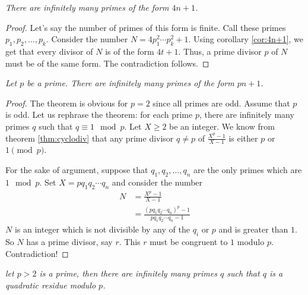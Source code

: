 \documentclass{subfiles}
\begin{document}
		\begin{theorem}\slshape
			There are infinitely many primes of the form $4n+1$.
		\end{theorem}

		\begin{proof}
			Let's say the number of primes of this form is finite. Call these primes $p_1,p_2,\ldots,p_k$. Consider the number $N=4p_1^2\cdots p_k^2+1$. Using corollary \eqref{cor:4n+1}, we get that every divisor of $N$ is of the form $4t+1$. Thus, a prime divisor $p$ of $N$ must be of the same form. The contradiction follows.
		\end{proof}

		\begin{theorem}\slshape
			Let $p$ be a prime. There are infinitely many primes of the form $pn+1$.
		\end{theorem}

		\begin{proof}
			The theorem is obvious for $p=2$ since all primes are odd. Assume that $p$ is odd. Let us rephrase the theorem: for each prime $p$, there are infinitely many primes $q$ such that $q\equiv1\mod{p}$. Let $X \geq 2$ be an integer. We know from theorem \autoref{thm:cyclodiv} that any prime divisor $q \neq p$ of $\frac{X^{p}-1}{X-1}$ is either $p$ or $1 \pmod p$.

			For the sake of argument, suppose that $q_{1},q_{2},\ldots,q_{n}$ are the only primes which are $1\mod{p}$. Set $X=pq_{1}q_{2}\cdots q_{n}$ and consider the number
				\begin{align*}
					N & =\frac{X^{p}-1}{X-1}\\
					  & = \frac{(pq_1q_2\cdots q_n)^p-1}{pq_1q_2\cdots q_n-1}
				\end{align*}
			$N$ is an integer which is not divisible by any of the $q_{i}$ or $p$ and is greater than $1$. So $N$ has a prime divisor, say $r$. This $r$ must be congruent to $1$ modulo $p$. Contradiction!
		\end{proof}

		\begin{theorem}\slshape
			let $p>2$ is a prime, then there are infinitely many primes $q$ such that $q$ is a quadratic residue modulo $p$.
		\end{theorem}
\end{document}
